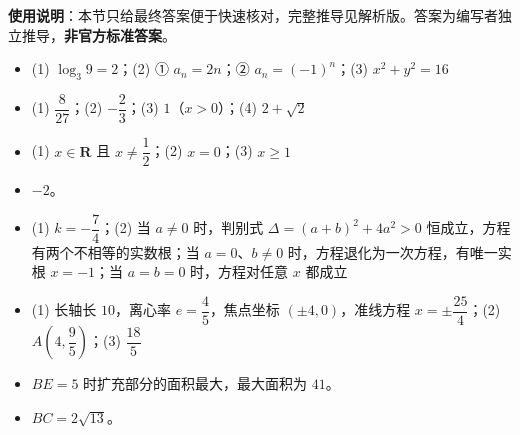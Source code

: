 
\begin{gknotice}
\textbf{使用说明}：本节只给最终答案便于快速核对，完整推导见解析版。答案为编写者独立推导，\textbf{非官方标准答案}。
\end{gknotice}

\begin{itemize}[leftmargin=2.6em]
  \item[\textbf{1.}] (1) $\log_3 9=2$；(2) ① $a_n=2n$；② $a_n=(-1)^n$；(3) $x^2+y^2=16$
  \item[\textbf{2.}] (1) $\dfrac{8}{27}$；(2) $-\dfrac23$；(3) $1$（$x>0$）；(4) $2+\sqrt2$
  \item[\textbf{3.}] (1) $x\in\mathbf R$ 且 $x\ne\dfrac12$；(2) $x=0$；(3) $x\ge1$
  \item[\textbf{4.}] $-2$。
  \item[\textbf{5.}] (1) $k=-\dfrac74$；(2) 当 $a\ne0$ 时，判别式 $\Delta=(a+b)^2+4a^2>0$ 恒成立，方程有两个不相等的实数根；当 $a=0$、$b\ne0$ 时，方程退化为一次方程，有唯一实根 $x=-1$；当 $a=b=0$ 时，方程对任意 $x$ 都成立
  \item[\textbf{6.}] (1) 长轴长 $10$，离心率 $e=\dfrac45$，焦点坐标 $(\pm4,0)$，准线方程 $x=\pm\dfrac{25}{4}$；(2) $A\left(4,\dfrac95\right)$；(3) $\dfrac{18}{5}$
  \item[\textbf{7.}] $BE=5$ 时扩充部分的面积最大，最大面积为 $41$。
  \item[\textbf{8.}] $BC=2\sqrt{13}$。
\end{itemize}
